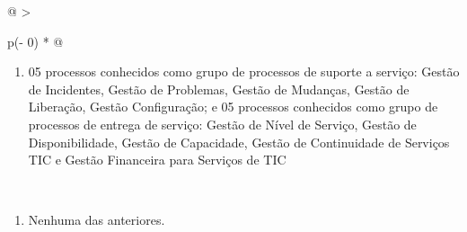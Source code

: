 \documentclass[
]{book}
\providecommand{\tightlist}{%
  \setlength{\itemsep}{0pt}\setlength{\parskip}{0pt}}
\begin{document}
\begin{longtable}[]{@{}
  >{\raggedright\arraybackslash}p{(\columnwidth - 0\tabcolsep) * }@{}}
\begin{minipage}[t]{\linewidth}
\begin{enumerate}
\def\labelenumi{\Alph{enumi})}
\setcounter{enumi}{3}
\tightlist
\item
  05 processos conhecidos como grupo de processos de suporte a serviço: Gestão de Incidentes, Gestão de Problemas, Gestão de Mudanças, Gestão de Liberação, Gestão Configuração; e 05 processos conhecidos como grupo de processos de entrega de serviço: Gestão de Nível de Serviço, Gestão de Disponibilidade, Gestão de Capacidade, Gestão de Continuidade de Serviços TIC e Gestão Financeira para Serviços de TIC
\end{enumerate}
\end{minipage} \\
\begin{minipage}[t]{\linewidth}\raggedright
\begin{enumerate}
\def\labelenumi{\Alph{enumi})}
\setcounter{enumi}{4}
\tightlist
\item
  Nenhuma das anteriores.
\end{enumerate}
\end{minipage} \\
\end{longtable}
\end{document}
